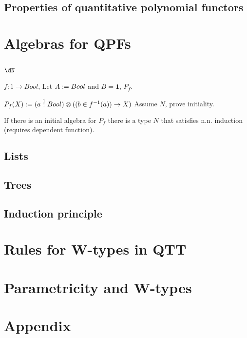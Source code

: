\documentclass[12pt,a4paper]{article}
\begin{document}
\subsection{Properties of quantitative polynomial functors}

\section{Algebras for QPFs}

\subsection{$\dN$}
$f : 1 \to Bool$, Let $A := Bool$ and $B = \mathbf{1}$, $P_f$. 

$P_f(X) := (a \overset{1}{:} Bool)\otimes((b \in f^{-1}(a)) \to X)$
Assume $N$, prove initiality.

If there is an initial algebra for $P_f$ there is a type $N$ that satisfies n.n. induction (requires dependent function).
\subsection{Lists}
\subsection{Trees}

\subsection{Induction principle}

\section{Rules for W-types in QTT}
\section{Parametricity and W-types}

\newpage
\section{Appendix}
\end{document}
